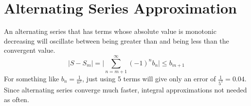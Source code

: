 \documentclass{article}
\theoremstyle{mytheoremstyle}
\theoremstyle{mytheoremstyle}
\theoremstyle{myproblemstyle}
\begin{document}
    \section*{Alternating Series Approximation}
    An alternating series that has terms whose absolute value is  monotonic
    decreasing will oscillate between being greater than and being less than the
    convergent value.
    \[
        |S - S_m| = \Big|\sum_{n=m+1}^{\infty} (-1)^n b_n\Big| \le b_{m+1}
    \]
    For something like $b_n= \frac{1}{n^2}$, just using 5 terms will give only
    an error of $\frac{1}{5^2} = 0.04$. Since alternating series converge much
    faster, integral approximations not needed as often.
\end{document}
